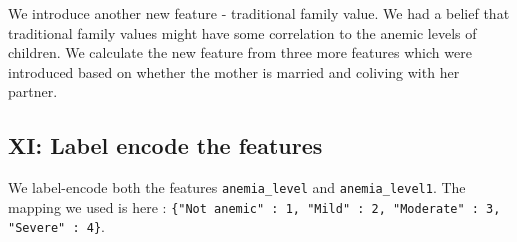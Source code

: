 We introduce another new feature - traditional family value. We had a belief that traditional family values might have some correlation to the anemic levels of children. We calculate the new feature from three more features which were introduced based on whether the mother is married and coliving with her partner.




\subsection{XI: Label encode the features}

We label-encode both the features \texttt{anemia\_level} and \texttt{anemia\_level1}.  The mapping we used is here : \texttt{\{"Not anemic" : 1, "Mild" : 2, "Moderate" : 3, "Severe" : 4\}}.





























